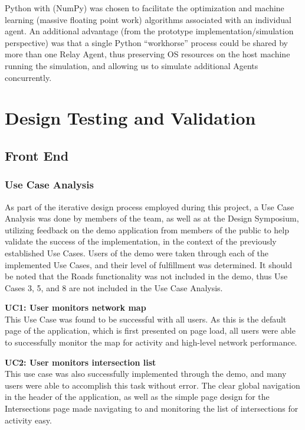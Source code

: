 \documentclass{report}
\begin{document}
Python with (NumPy) was chosen to facilitate the optimization and machine learning (massive floating point work) algorithms associated with an individual agent.
An additional advantage (from the prototype implementation/simulation perspective) was that a single Python ``workhorse'' process could be shared by more than one Relay Agent, thus preserving OS resources on the host machine running the simulation, and allowing us to simulate additional Agents concurrently.


\newpage
\chapter{Design Testing and Validation}

\section{Front End}
\subsection{Use Case Analysis}
As part of the iterative design process employed during this project, a Use Case Analysis was done by members of the team, as well as at the Design Symposium, utilizing feedback on the demo application from members of the public to help validate the success of the implementation, in the context of the previously established Use Cases.
Users of the demo were taken through each of the implemented Use Cases, and their level of fulfillment was determined.
It should be noted that the Roads functionality was not included in the demo, thus Use Cases 3, 5, and 8 are not included in the Use Case Analysis.

\noindent \textbf{UC1: User monitors network map} \\
This Use Case was found to be successful with all users.
As this is the default page of the application, which is first presented on page load, all users were able to successfully monitor the map for activity and high-level network performance.

\noindent \textbf{UC2: User monitors intersection list} \\
This use case was also successfully implemented through the demo, and many users were able to accomplish this task without error.
The clear global navigation in the header of the application, as well as the simple page design for the Intersections page made navigating to and monitoring the list of intersections for activity easy.
\end{document}
